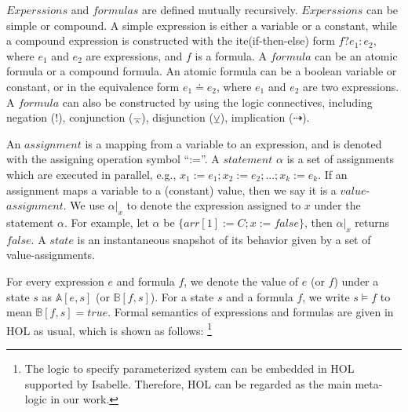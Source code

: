 \documentclass[final]{IEEEtran}
\def \eqc {\doteq }
\def \andc {\barwedge }
\def \negc {!}
\def \orc {\veebar }
\begin{document}


$Experssions$ and $formulas$ are defined mutually recursively. $Experssions$ can be simple or compound. A simple expression is either a variable or a constant, while a compound expression is constructed with the ite(if-then-else) form $f?e_1:e_2$, where $e_1$ and $e_2$ are expressions, and $f$ is a formula.
A $formula$ can be an atomic formula or a compound formula. An atomic formula can be a boolean variable or  constant, or in the equivalence form $e_1\eqc e_2$, where $e_1$ and $e_2$ are two expressions. A $formula$ can also be constructed by using the logic connectives, including negation ($\negc$), conjunction ($\andc$), disjunction ($\orc$), implication ($\dashrightarrow$). %

An $assignment$ is a mapping from a variable to an expression, and is denoted with the assigning operation symbol ``:=''. A $statement$ $\alpha$ is a set of assignments which are executed in parallel, e.g., $ x_1:=e_1;x_2:=e_2;...;x_k:=e_k $. If an assignment maps a variable to a (constant) value, then we say it is a $value$-$assignment$.  We use $\alpha|_x$ to denote the expression assigned to $x$ under the statement $\alpha$. For example, let $\alpha$ be $\{arr[1]:=C;x:=false\}$, then $\alpha|_x$ returns $false$. A $state$ is an instantaneous snapshot of its behavior given by a set of value-assignments.




For every expression $e$ and formula $f$, we denote the value of $e$ (or $f$) under a state $s$ as $\mathbb{A}[e,s]$ (or $\mathbb{B}[f,s]$).
For a state $s$ and a formula $f$, we write
$s\models f$ to mean %
$\mathbb{B}[f,s]=true$.
Formal semantics of expressions and formulas are given in HOL  as usual, which is shown as follows: \footnote{The logic to specify parameterized system  can be embedded in HOL supported by Isabelle. Therefore, HOL can be regarded as the main meta-logic in our work.}\\
\end{document}
